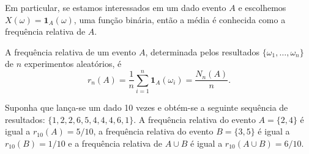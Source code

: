 %
%
%
%
%
%

\begin{frame}
Em particular, se estamos interessados em um dado evento $A$ e
escolhemos $X(\omega)=\mathbf{1}_A(\omega)$, uma função binária, então a
média é conhecida como a frequência relativa de $A$.

\begin{defi}
A frequência relativa de um evento $A$, determinada pelos resultados
$\{\omega_1,\ldots,\omega_n\}$ de $n$ experimentos aleatórios, é
$$r_n(A)=\frac{1}{n}\sum_{i=1}^{n}\mathbf{1}_A(\omega_i)=\frac{N_n(A)}{n}.$$
\end{defi}

\begin{exem}
	Suponha que lança-se um dado 10 vezes e obtém-se a seguinte sequência de resultados: $\{1,2,2,6,5,4,4,4,6,1\}$.
	A frequência relativa do evento $A=\{2,4\}$ é igual a $r_{10}(A)=5/10$, a frequência relativa do evento $B=\{3,5\}$ é igual a $r_{10}(B)=1/10$ e a frequência relativa de $A\cup B$ é igual a $r_{10}(A\cup B)=6/10$.
	
\end{exem}

\end{frame}
%
%
%


